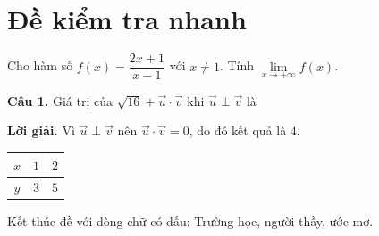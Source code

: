 \documentclass[12pt]{article}
\begin{document}
\section*{Đề kiểm tra nhanh}
Cho hàm số $f(x)=\dfrac{2x+1}{x-1}$ với $x\neq 1$. Tính $\lim\limits_{x\to+\infty} f(x)$.



\textbf{Câu 1.} 
Giá trị của $\sqrt{16}+\vec{u}\cdot\vec{v}$ khi $\vec u\perp\vec v$ là


\textbf{Lời giải.} Vì $\vec u\perp\vec v$ nên $\vec u\cdot\vec v=0$, do đó kết quả là $4$.






\begin{tabular}{|c|c|c|}
\hline
$x$ & $1$ & $2$ \\ \hline
$y$ & $3$ & $5$ \\ \hline
\end{tabular}

Kết thúc đề với dòng chữ có dấu: Trường học, người thầy, ước mơ.
\end{document}

